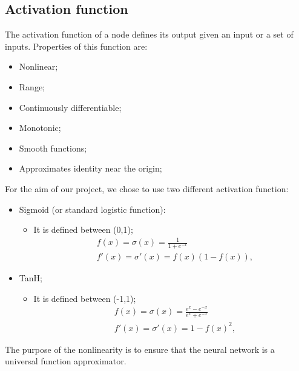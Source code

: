 \subsection{Activation function}
\label{activationFunction}
The activation function of a node defines its output given an input or a set of inputs. 
Properties of this function are:
\begin{itemize}
	\item Nonlinear;
	\item Range;
	\item Continuously differentiable;
	\item Monotonic;
	\item Smooth functions;
	\item Approximates identity near the origin;
\end{itemize}

For the aim of our project, we chose to use two different activation function:
\begin{itemize}
	\label{sigmoid}
	\item Sigmoid (or standard logistic function):
	\begin{itemize}
		\item It is defined between (0,1); 		
			\begin{align*}
			&f(x) = \sigma(x) = \frac{1}{1 + e^{-x}} \\
			&f'(x) = \sigma'(x) = f(x)(1 - f(x)),
			\end{align*} 
	\end{itemize}
	\item TanH;
	\label{tanH}
	\begin{itemize}
		\item It is defined between (-1,1); 		
		\begin{align*}
		&f(x) = \sigma(x) = \frac{e^{x}-e^{-x}}{e^{x} + e^{-x}} \\
		&f'(x) = \sigma'(x) = 1 - f(x)^{2},
		\end{align*} 
	\end{itemize}
\end{itemize}
The purpose of the nonlinearity is to ensure that the neural network is a universal function approximator.
